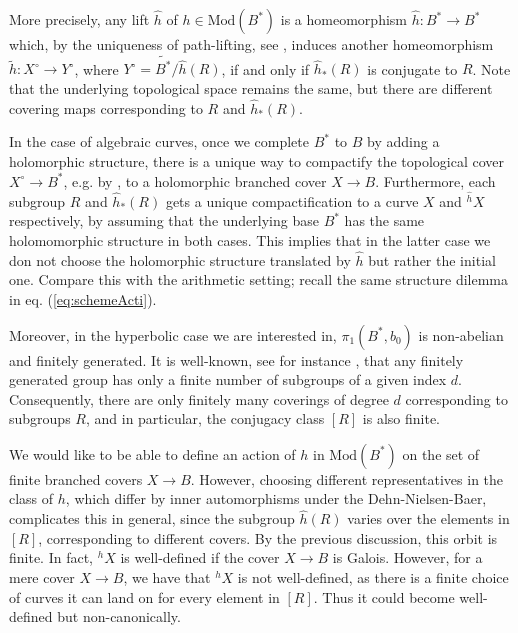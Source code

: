 \documentclass[10pt]{amsart}
\theoremstyle{definition}
\begin{document}
More precisely, any lift $\hat{h}$ of $h \in \mathrm{Mod}(B^*)$ is a homeomorphism $\hat{h} \colon B^* \to B^*$ which, by the uniqueness of path-lifting, see \cite[Prop. 13.5]{MR1343250}, induces another homeomorphism $\tilde{h} \colon X^\circ \rightarrow Y^\circ$, where $Y^\circ = \widetilde{B^*}/\hat{h}(R)$, if and only if $\hat h_*(R)$ is conjugate to $R$. Note that the underlying topological space remains the same, but there are different covering maps corresponding to $R$ and $\hat{h}_*(R)$.


In the case of algebraic curves, once we complete $B^*$ to $B$ by adding a holomorphic structure, there is a unique way to compactify the topological cover $X^\circ\rightarrow B^*$, e.g. by \cite[Prop. 19.9, Ex. 19.10]{MR1343250}, to a holomorphic branched cover $X\rightarrow B$. Furthermore, each subgroup $R$ and $\hat{h}_*(R)$ gets a unique compactification to a curve $X$ and ${^{\hat{h}} \! X}$ respectively, by assuming that the underlying base $B^*$ has the same holomomorphic structure in both cases. This implies that in the latter case we don not choose the holomorphic structure translated by $\hat{h}$ but rather the initial one. Compare this with the arithmetic setting; recall the same structure dilemma in eq. (\ref{eq:schemeActi}).


Moreover, in the hyperbolic case we are interested in, $\pi_1(B^*,b_0)$ is non-abelian and finitely generated. It is well-known, see for instance \cite[Thm. 29.10]{bogoGrp}, that any finitely generated group has only a finite number of subgroups of a given index $d$. Consequently, there are only finitely many coverings of degree $d$ corresponding to subgroups $R$, and in particular, the conjugacy class $[R]$ is also finite.

We would like to be able to define an action of $h$ in $\mathrm{Mod}(B^*)$ on the set of finite branched covers $X\rightarrow B$. However, choosing different representatives in the class of $h$, which differ by inner automorphisms under the Dehn-Nielsen-Baer, complicates this in general, since the subgroup $\hat{h}(R)$ varies over the elements in $[R]$, corresponding to different covers. By the previous discussion, this orbit is finite. In fact, $ {^h \! X}$ is well-defined if the cover $X\rightarrow B$ is Galois. However, for a mere cover $X\rightarrow B$, we have that ${^h \! X}$ is not well-defined, as there is a finite choice of curves it can land on for every element in $[R]$. Thus it could become well-defined but non-canonically.
\end{document}
